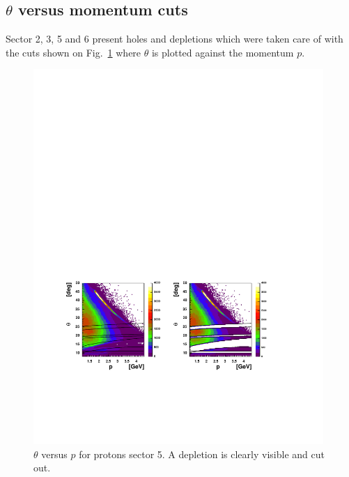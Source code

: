 \subsection{ $\theta$ versus momentum cuts}
Sector 2, 3, 5 and 6 present holes and depletions which were taken care of with the
cuts shown on Fig.~\ref{fig:proton_tp} where $\theta$ is plotted against the momentum $p$.

\begin{figure}[h]
    \begin{center}
        \includegraphics[width=0.98\textwidth]{img/proton_tp}
        \caption[$\theta$ versus $p$ for protons sector 5]
        { $\theta$ versus $p$ for protons sector 5. A depletion is clearly visible and cut out.}
        \label{fig:proton_tp}
    \end{center}
\end{figure}




